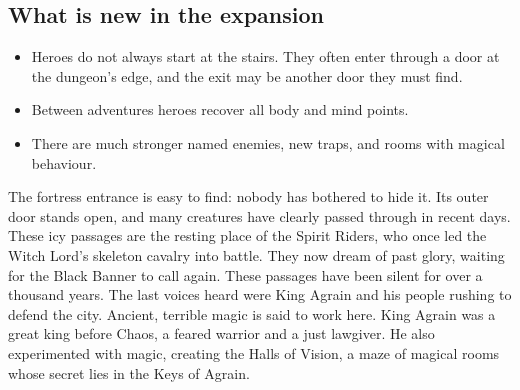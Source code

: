 \subsection*{What is new in the expansion}
\begin{itemize}
\item Heroes do not always start at the stairs. They often enter through a door at the dungeon's edge, and the exit may be another door they must find.
\item Between adventures heroes recover all body and mind points.
\item There are much stronger named enemies, new traps, and rooms with magical behaviour.
\end{itemize}
The fortress entrance is easy to find: nobody has bothered to hide it. Its outer door stands open, and many creatures have clearly passed through in recent days.
These icy passages are the resting place of the Spirit Riders, who once led the Witch Lord's skeleton cavalry into battle. They now dream of past glory, waiting for the Black Banner to call again.
These passages have been silent for over a thousand years. The last voices heard were King Agrain and his people rushing to defend the city. Ancient, terrible magic is said to work here.
King Agrain was a great king before Chaos, a feared warrior and a just lawgiver. He also experimented with magic, creating the Halls of Vision, a maze of magical rooms whose secret lies in the Keys of Agrain.
